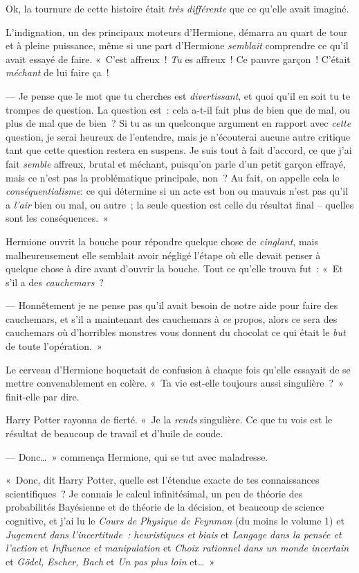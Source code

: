 Ok, la tournure de cette histoire était \emph{très différente} que ce qu'elle avait imaginé.

L'indignation, un des principaux moteurs d'Hermione, démarra au quart de tour et à pleine puissance, même si une part d'Hermione \emph{semblait} comprendre ce qu'il avait essayé de faire.
«~C'est affreux~! \emph{Tu} es affreux~! Ce pauvre garçon~! C'était \emph{méchant} de lui faire ça~!

--- Je pense que le mot que tu cherches est \emph{divertissant}, et quoi qu'il en soit tu te trompes de question.
La question est~: cela a-t-il fait plus de bien que de mal, ou plus de mal que de bien~?
Si tu as un quelconque argument en rapport avec \emph{cette} question, je serai heureux de l'entendre, mais je n'écouterai aucune autre critique tant que cette question restera en suspens.
Je suis tout à fait d'accord, ce que j'ai fait \emph{semble} affreux, brutal et méchant, puisqu'on parle d'un petit garçon effrayé, mais ce n'est pas la problématique principale, non~?
Au fait, on appelle cela le \emph{conséquentialisme}: ce qui détermine si un acte est bon ou mauvais n'est pas qu'il a \emph{l'air} bien ou mal, ou autre~; la seule question est celle du résultat final -- quelles sont les conséquences.~»

Hermione ouvrit la bouche pour répondre quelque chose de \emph{cinglant}, mais malheureusement elle semblait avoir négligé l'étape où elle devait penser à quelque chose à dire avant d'ouvrir la bouche.
Tout ce qu'elle trouva fut~:
«~Et s'il a des \emph{cauchemars}~?

--- Honnêtement je ne pense pas qu'il avait besoin de notre aide pour faire des cauchemars, et s'il a maintenant des cauchemars à \emph{ce} propos, alors ce sera des cauchemars où d'horribles monstres vous donnent du chocolat ce qui était le \emph{but} de toute l'opération.~»

Le cerveau d'Hermione hoquetait de confusion à chaque fois qu'elle essayait de se mettre convenablement en colère.
«~Ta vie est-elle toujours aussi singulière~?~» finit-elle par dire.

Harry Potter rayonna de fierté.
«~Je la \emph{rends} singulière. Ce que tu vois est le résultat de beaucoup de travail et d'huile de coude.

--- Donc…~» commença Hermione, qui se tut avec maladresse.

«~Donc, dit Harry Potter, quelle est l'étendue exacte de tes connaissances scientifiques~?
Je connais le calcul infinitésimal, un peu de théorie des probabilités Bayésienne et de théorie de la décision, et beaucoup de science cognitive, et j'ai lu le \emph{Cours de Physique de Feynman} (du moins le volume 1) et \emph{Jugement dans l'incertitude~: heuristiques et biais} et \emph{Langage dans la pensée et l'action} et \emph{Influence et manipulation} et \emph{Choix rationnel dans un monde incertain} et \emph{Gödel, Escher, Bach} et \emph{Un pas plus loin} et…~»

